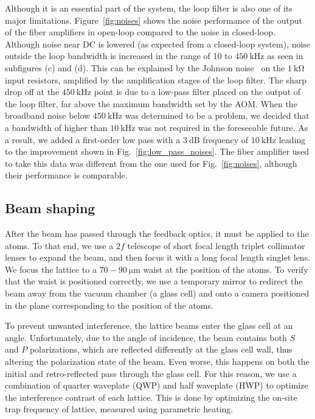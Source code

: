 \documentclass[twocolumn,aps,pra,showpacs,preprintnumbers,bibnotes]{revtex4-1}
\newcommand\unit[2]{\ensuremath{#1~\mathrm{{#2}}}}
\begin{document}
Although it is an essential part of the system, the loop filter is also one of its major limitations. Figure~\ref{fig:noises} shows the noise performance of the output of the fiber amplifiers in open-loop compared to the noise in closed-loop. Although noise near DC is lowered (as expected from a closed-loop system), noise outside the loop bandwidth is increased in the range of 10 to \unit{450}{kHz} as seen in subfigures (c) and (d).
This can be explained by the Johnson noise~\cite{Horowitz2015} on the \unit{1}{k\Omega} input resistors, amplified by the amplification stages of the loop filter.
The sharp drop off at the \unit{450}{kHz} point is due to a low-pass filter placed on the output of the loop filter, far above the maximum bandwidth set by the AOM.
When the broadband noise below \unit{450}{kHz} was determined to be a problem, we decided that a bandwidth of higher than \unit{10}{kHz} was not required in the foreseeable future.
As a result, we added a first-order low pass with a \unit{3}{dB} frequency of \unit{10}{kHz} leading to the improvement shown in Fig.~\ref{fig:low_pass_noises}. The fiber amplifier used to take this data was different from the one used for Fig.~\ref{fig:noises}, although their performance is comparable.


\subsection{Beam shaping}
After the beam has passed through the feedback optics, it must be applied to the atoms. To that end, we use a $2f$ telescope of short focal length triplet collimator lenses to expand the beam, and then focus it with a long focal length singlet lens.
We focus the lattice to a \unit{70-90}{\mu{}m} waist at the position of the atoms.
To verify that the waist is positioned correctly, we use a temporary mirror to redirect the beam away from the vacuum chamber (a glass cell) and onto a camera positioned in the plane corresponding to the position of the atoms.

To prevent unwanted interference, the lattice beams enter the glass cell at an angle.
Unfortunately, due to the angle of incidence, the beam contains both $S$ and $P$ polarizations, which are reflected differently at the glass cell wall, thus altering the polarization state of the beam.
Even worse, this happens on both the initial and retro-reflected pass through the glass cell.
For this reason, we use a combination of quarter waveplate (QWP) and half waveplate (HWP) to optimize the interference contrast of each lattice.
This is done by optimizing the on-site trap frequency of lattice, measured using parametric heating.
\end{document}
